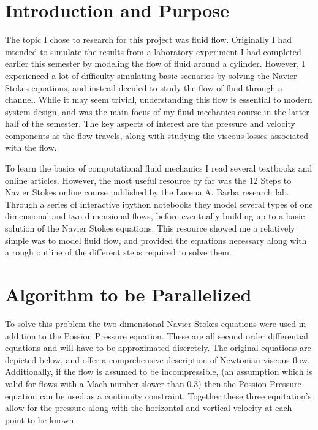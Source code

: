 \documentclass[12pt]{article}
\begin{document}
\maketitle

\section{Introduction and Purpose}
The topic I chose to research for this project was fluid flow. Originally I had intended to simulate the results
from a laboratory experiment I had completed earlier this semester by modeling the flow of fluid around a cylinder. 
However, I experienced a lot of difficulty simulating basic scenarios by solving the Navier Stokes equations, and 
instead decided to study the flow of fluid through a channel. While it may seem trivial, understanding this flow is 
essential to modern system design, and was the main focus of my fluid mechanics course in the latter half of the 
semester. The key aspects of interest are the pressure and velocity components as the flow travels, along with 
studying the viscous losses associated with the flow. 

To learn the basics of computational fluid mechanics I read several textbooks and online articles. However, the most 
useful resource by far was the 12 Steps to Navier Stokes online course published by the Lorena A. Barba research lab. 
Through a series of interactive ipython notebooks they model several types of one dimensional and two dimensional 
flows, before eventually building up to a basic solution of the Navier Stokes equations. This resource showed me a 
relatively simple was to model fluid flow, and provided the equations necessary along with a rough outline of the 
different steps required to solve them.

\section{Algorithm to be Parallelized}
To solve this problem the two dimensional Navier Stokes equations were used in addition to the Possion Pressure 
equation. These are all second order differential equations and will have to be approximated discretely. The original 
equations are depicted below, and offer a comprehensive description of Newtonian viscous flow. Additionally, if the 
flow is assumed to be incompressible, (an assumption which is valid for flows with a Mach number slower than 0.3) then 
the Possion Pressure equation can be used as a continuity constraint. Together these three equitation's allow for the 
pressure along with the  horizontal and vertical velocity at each point to be known.
\end{document}

